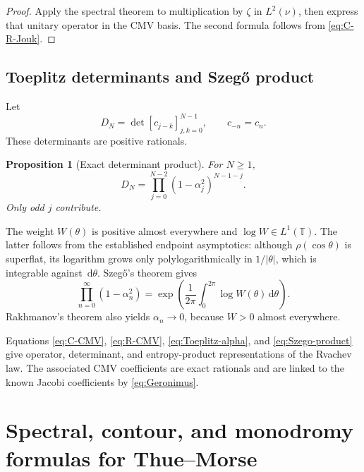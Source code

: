 \documentclass[11pt,oneside]{article}
\newtheorem{proposition}[theorem]{Proposition}
\theoremstyle{definition}
\newcommand{\dd}{\,\mathrm d}
\newcommand{\T}{\mathbb T}
\begin{document}
\begin{proof}
Apply the spectral theorem to multiplication by \(\zeta\) in \(L^2(\nu)\), then express that
unitary operator in the CMV basis. The second formula follows from
\eqref{eq:C-R-Jouk}.
\end{proof}

\subsection{Toeplitz determinants and Szeg\H{o} product}

Let
\begin{equation}
 D_N=\det[c_{j-k}]_{j,k=0}^{N-1},\qquad c_{-n}=c_n.
 \label{eq:Toeplitz-D}
\end{equation}
These determinants are positive rationals.

\begin{proposition}[Exact determinant product]
\label{prop:Toeplitz-product}
For \(N\ge1\),
\begin{equation}
 D_N=\prod_{j=0}^{N-2}(1-\alpha_j^2)^{N-1-j}.
 \label{eq:Toeplitz-alpha}
\end{equation}
Only odd \(j\) contribute.
\end{proposition}

The weight \(W(\theta)\) is positive almost everywhere and
\(\log W\in L^1(\T)\). The latter follows from the established endpoint asymptotics:
although \(\rho(\cos\theta)\) is superflat, its logarithm grows only polylogarithmically in
\(1/|\theta|\), which is integrable against \(\dd\theta\). Szeg\H{o}'s theorem gives
\begin{equation}
 \boxed{\displaystyle
 \prod_{n=0}^{\infty}(1-\alpha_n^2)
 =\exp\left(\frac1{2\pi}\int_0^{2\pi}\log W(\theta)\dd\theta\right).}
 \label{eq:Szego-product}
\end{equation}
Rakhmanov's theorem also yields \(\alpha_n\to0\), because \(W>0\) almost everywhere.

\begin{novelbox}
Equations \eqref{eq:C-CMV}, \eqref{eq:R-CMV}, \eqref{eq:Toeplitz-alpha}, and
\eqref{eq:Szego-product} give operator, determinant, and entropy-product representations of
the Rvachev law. The associated CMV coefficients are exact rationals and are linked to the
known Jacobi coefficients by \eqref{eq:Geronimus}.
\end{novelbox}

\section{Spectral, contour, and monodromy formulas for Thue--Morse}
\label{sec:TM}
\end{document}
